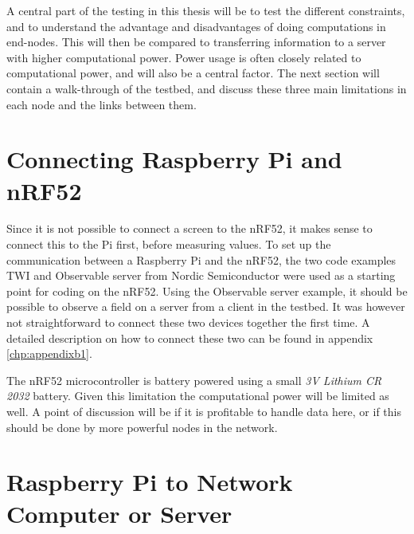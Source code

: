 \noindent A central part of the testing in this thesis will be to test the different constraints, and to understand the advantage and disadvantages of doing computations in end-nodes. This will then be compared to transferring  information to a server with higher computational power. Power usage is often closely related to computational power, and will also be a central factor. The next section will contain a walk-through of the testbed, and discuss these three main limitations in each node and the links between them.


\section{Connecting Raspberry Pi and nRF52}


\noindent Since it is not possible to connect a screen to the \gls{nRF52}, it makes sense to connect this to the Pi first, before measuring values. To set up the communication between a \gls{Raspberry Pi} and the \gls{nRF52}, the two code examples TWI and Observable server from Nordic Semiconductor were used as a starting point for coding on the nRF52. Using the Observable server example, it should be possible to observe a field on a server from a client in the testbed. It was however not straightforward to connect these two devices together the first time. A detailed description on how to connect these two can be found in appendix \ref{chp:appendixb1}. 
  

\noindent The nRF52 microcontroller is battery powered using a small \textit{3V Lithium CR 2032} battery. Given this limitation the computational power will be limited as well. A point of discussion will be if it is profitable to handle data here, or if this should be done by more powerful nodes in the network. 

\section{Raspberry Pi to Network Computer or Server} 

